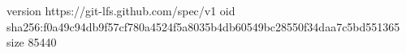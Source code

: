 version https://git-lfs.github.com/spec/v1
oid sha256:f0a49c94db9f57cf780a4524f5a8035b4db60549bc28550f34daa7c5bd551365
size 85440
